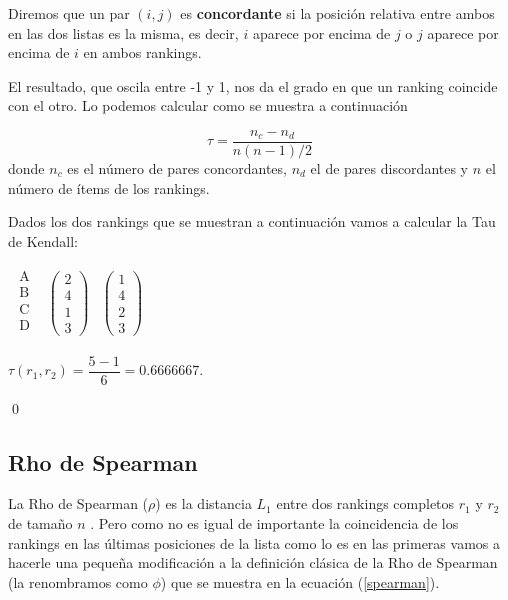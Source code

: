 \begin{defi} Diremos que un par $(i,j)$ es \textbf{concordante} si la posición relativa entre ambos en las dos listas es la misma, es decir, $i$ aparece por encima de $j$ o $j$ aparece por encima de $i$ en ambos rankings.
\end{defi}

El resultado, que oscila entre -1 y 1, nos da el grado en que un ranking coincide con el otro. Lo podemos calcular como se muestra a continuación

\begin{equation}
\tau = \dfrac{n_{c} - n_{d}}{n(n-1)/2}
\end{equation}
donde $n_{c}$ es el número de pares concordantes, $n_{d}$ el de pares discordantes y $n$ el número de ítems de los rankings. 

\begin{ejem} Dados los dos rankings que se muestran a continuación vamos a calcular la Tau de Kendall:
\end{ejem}
\begin{center}
$\begin{array}{ccc}
\begin{array}{c}
\text{A}\\
\text{B} \\
\text{C} \\
\text{D} \\
\end{array} & \left(\begin{array}{c}
2\\
4\\
1\\
3
\end{array} \right)& \left(\begin{array}{c}
1\\
4\\
2\\
3
\end{array} \right)
\end{array}$  
\end{center}


\begin{center}
$ \tau (r_{1},r_{2}) = \dfrac{5-1}{6}=0.6666667$.
\end{center}
\qed

\subsection{Rho de Spearman}
La Rho de Spearman ($\rho$) es la distancia $L_{1}$ entre dos rankings completos $r_{1}$ y $r_{2}$ de tamaño $n$ \cite[pág 206]{comparacion}. Pero como no es igual de importante la coincidencia de los rankings en las últimas posiciones de la lista como lo es en las primeras vamos a hacerle una pequeña modificación a la definición clásica de la Rho de Spearman (la renombramos como $\phi$) que se muestra en la ecuación (\ref{spearman}). 


